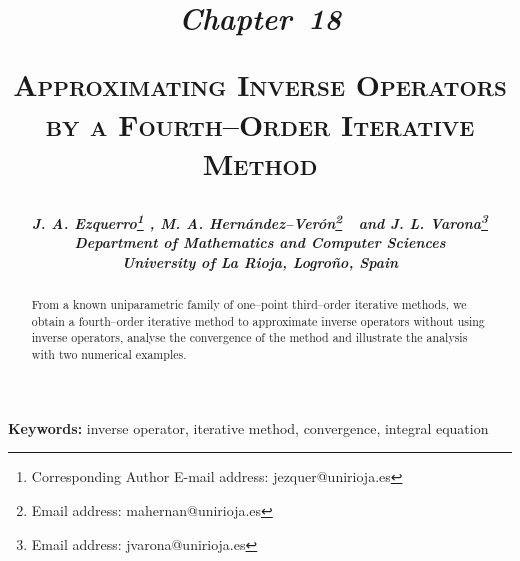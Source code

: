\documentclass[11pt,twoside,letterpaper]{article} %
\begin{document}
\title{
{\begin{flushleft}
\vskip 0.45in
{\normalsize\bfseries\textit{Chapter~18}}
\end{flushleft}
\vskip 0.45in
\bfseries\scshape Approximating Inverse Operators\\
by a Fourth--Order Iterative Method}}
\author{\bfseries\itshape J. A. Ezquerro\thanks{Corresponding Author E-mail address: jezquer@unirioja.es} ,
\bfseries\itshape M. A. Hern\'andez--Ver\'on\thanks{Email address: mahernan@unirioja.es}\ \ and
\bfseries\itshape J. L. Varona\thanks{Email address: jvarona@unirioja.es}\\
Department of Mathematics and Computer Sciences\\
University of La Rioja, Logro\~no, Spain
}
\date{}
\maketitle
\thispagestyle{empty}
\setcounter{page}{199}
\thispagestyle{fancy}
\fancyhead{}
\fancyfoot{}
\renewcommand{\headrulewidth}{0pt}


\begin{abstract}
From a known uniparametric family of one--point third--order iterative methods, we obtain a fourth--order iterative method to approximate inverse operators without using inverse operators, analyse the convergence of the method and illustrate the analysis with two numerical examples.
\end{abstract}

\noindent\textbf{Keywords:} inverse operator, iterative method, convergence, integral equation
\end{document}
